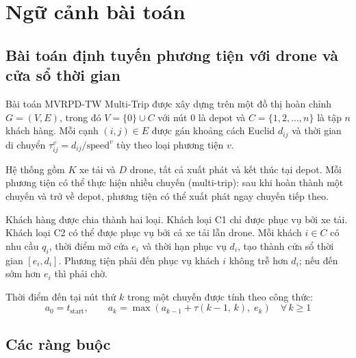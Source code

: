 \documentclass[../DoAn.tex]{subfiles}
\begin{document}

\section{Ngữ cảnh bài toán}
\label{sec:ngucanh}

\subsection{Bài toán định tuyến phương tiện với drone và cửa sổ thời gian}

Bài toán MVRPD-TW Multi-Trip được xây dựng trên một đồ thị hoàn chỉnh $G = (V, E)$, trong đó $V = \{0\} \cup C$ với nút $0$ là depot và $C = \{1, 2, \ldots, n\}$ là tập $n$ khách hàng. Mỗi cạnh $(i, j) \in E$ được gán khoảng cách Euclid $d_{ij}$ và thời gian di chuyển $\tau_{ij}^v = d_{ij} / \text{speed}^v$ tùy theo loại phương tiện $v$.

Hệ thống gồm $K$ xe tải và $D$ drone, tất cả xuất phát và kết thúc tại depot. Mỗi phương tiện có thể thực hiện nhiều chuyến (multi-trip): sau khi hoàn thành một chuyến và trở về depot, phương tiện có thể xuất phát ngay chuyến tiếp theo.

Khách hàng được chia thành hai loại. Khách loại C1 chỉ được phục vụ bởi xe tải. Khách loại C2 có thể được phục vụ bởi cả xe tải lẫn drone. Mỗi khách $i \in C$ có nhu cầu $q_i$, thời điểm mở cửa $e_i$ và thời hạn phục vụ $d_i$, tạo thành cửa sổ thời gian $[e_i, d_i]$. Phương tiện phải đến phục vụ khách $i$ không trễ hơn $d_i$; nếu đến sớm hơn $e_i$ thì phải chờ.

Thời điểm đến tại nút thứ $k$ trong một chuyến được tính theo công thức:
\[
a_0 = t_{\text{start}}, \qquad
a_k = \max\!\left(a_{k-1} + \tau(k{-}1,\, k),\; e_k\right) \quad \forall\, k \geq 1
\]

\subsection{Các ràng buộc}
\end{document}
